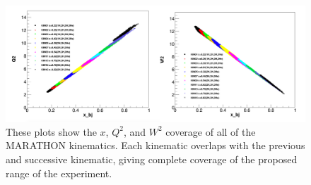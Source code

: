 \begin{figure}[h]
\begin{center}
	\includegraphics[width=\textwidth]{./analysis/fig/kin_plots.png}
	\caption{These plots show the $x$, $Q^2$, and $W^2$ coverage of all of the MARATHON kinematics. Each kinematic overlaps with the previous and successive kinematic, giving complete coverage of the proposed range of the experiment.\cite{Tong}}
	\label{fig:kin_plots}
\end{center}
\end{figure}

